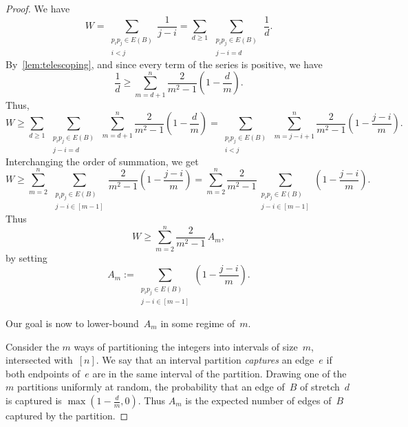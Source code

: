 \documentclass[11pt,a4paper]{article}
\begin{document}
\begin{proof}
  We have
  \[ W = \sum\limits_{\substack{p_ip_j \in E(B)\\i<j}} \frac{1}{j-i} = \sum\limits_{d \geqslant 1}~\sum\limits_{\substack{p_ip_j \in E(B)\\ j-i = d}}~\frac{1}{d}.\]
  By~\cref{lem:telescoping}, and since every term of the series is positive, we have
  \[\frac{1}{d} \geqslant \sum\limits_{m=d+1}^n \frac{2}{m^2-1} \left(1-\frac{d}{m}\right).\]
  Thus,
  \[ W \geqslant \sum\limits_{d \geqslant 1}~\sum\limits_{\substack{p_ip_j \in E(B)\\ j-i = d}}~\sum\limits_{m=d+1}^n \frac{2}{m^2-1} \left(1-\frac{d}{m}\right)
  = \sum\limits_{\substack{p_ip_j \in E(B)\\i<j}}~\sum\limits_{m=j-i+1}^n \frac{2}{m^2-1} \left(1-\frac{j-i}{m}\right).\]
  Interchanging the order of summation, we get
  \[ W \geqslant \sum\limits_{m=2}^n~\sum\limits_{\substack{p_ip_j \in E(B)\\ j-i \in [m-1]}} \frac{2}{m^2-1} \left(1-\frac{j-i}{m}\right)
  = \sum\limits_{m=2}^n \frac{2}{m^2-1} \sum\limits_{\substack{p_ip_j \in E(B)\\ j-i \in [m-1]}} \left(1-\frac{j-i}{m}\right).\]
  Thus
  \begin{equation}\label{eq:W}
    W \geqslant \sum\limits_{m=2}^n \frac{2}{m^2-1}\,A_m,
  \end{equation}
  by setting
  \[A_m := \sum\limits_{\substack{p_ip_j \in E(B)\\ j-i \in [m-1]}} \left(1-\frac{j-i}{m}\right).\]

  Our goal is now to lower-bound~$A_m$ in some regime of~$m$.

  Consider the $m$ ways of partitioning the integers into intervals of size~$m$, intersected with~$[n]$.
  We say that an interval partition \emph{captures} an edge~$e$ if both endpoints of~$e$ are in the same interval of the partition.
  Drawing one of the $m$ partitions uniformly at random, the probability that an edge of~$B$ of stretch~$d$ is captured is $\max(1-\frac{d}{m},0)$.
  Thus $A_m$ is the expected number of edges of~$B$ captured by the partition.


\end{proof}
\end{document}
